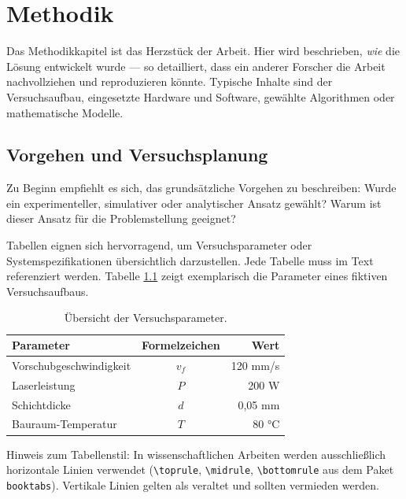 \chapter{Methodik}

Das Methodikkapitel ist das Herzstück der Arbeit. Hier wird beschrieben, \textit{wie} die Lösung entwickelt wurde — so detailliert, dass ein anderer Forscher die Arbeit nachvollziehen und reproduzieren könnte. Typische Inhalte sind der Versuchsaufbau, eingesetzte Hardware und Software, gewählte Algorithmen oder mathematische Modelle.

\section{Vorgehen und Versuchsplanung}

Zu Beginn empfiehlt es sich, das grundsätzliche Vorgehen zu beschreiben: Wurde ein experimenteller, simulativer oder analytischer Ansatz gewählt? Warum ist dieser Ansatz für die Problemstellung geeignet?

Tabellen eignen sich hervorragend, um Versuchsparameter oder Systemspezifikationen übersichtlich darzustellen. Jede Tabelle muss im Text referenziert werden. Tabelle \ref{tab:versuchsparameter} zeigt exemplarisch die Parameter eines fiktiven Versuchsaufbaus.

\begin{table}[htbp]
    \centering
    \caption{Übersicht der Versuchsparameter.}
    \label{tab:versuchsparameter}
    \begin{tabular}{l c r}
        \toprule
        \textbf{Parameter} & \textbf{Formelzeichen} & \textbf{Wert} \\
        \midrule
        Vorschubgeschwindigkeit & $v_f$ & 120 mm/s \\
        Laserleistung & $P$ & 200 W \\
        Schichtdicke & $d$ & 0,05 mm \\
        Bauraum-Temperatur & $T$ & 80 °C \\
        \bottomrule
    \end{tabular}
\end{table}

Hinweis zum Tabellenstil: In wissenschaftlichen Arbeiten werden ausschließlich horizontale Linien verwendet (\texttt{\textbackslash toprule}, \texttt{\textbackslash midrule}, \texttt{\textbackslash bottomrule} aus dem Paket \texttt{booktabs}). Vertikale Linien gelten als veraltet und sollten vermieden werden.


